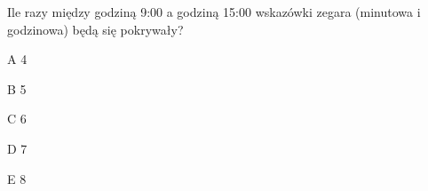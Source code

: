 \begin{tresc}
Ile razy między godziną 9:00 a godziną 15:00 wskazówki zegara (minutowa i godzinowa) będą się pokrywały?
\end{tresc}
\begin{wariant}{A} 4 \end{wariant}
\begin{wariant}{B} 5 \end{wariant}
\begin{wariant}{C} 6 \end{wariant}
\begin{wariant}{D} 7 \end{wariant}
\begin{wariant}{E} 8 \end{wariant}
